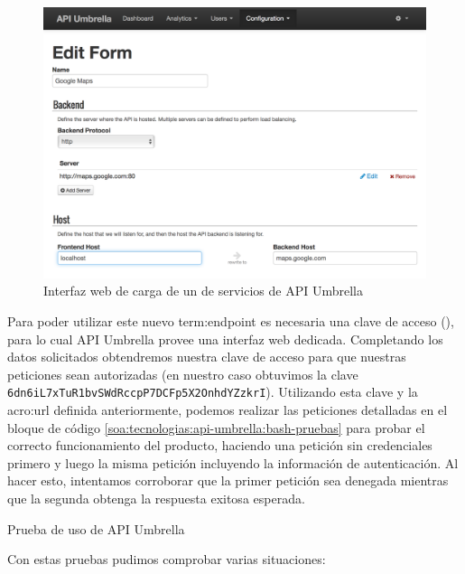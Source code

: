 \begin{figure}
  \includegraphics[width=\linewidth]{src/images/03-capitulo-3/tecnologias/api-umbrella/api-backend.png}
  \caption{Interfaz web de carga de un  de servicios de API Umbrella}
  \label{fig:api-umbrella-api-backend}
\end{figure}

Para poder utilizar este nuevo \gls{term:endpoint} es necesaria una clave de acceso (), para lo cual API Umbrella provee una interfaz web dedicada. Completando los datos solicitados obtendremos nuestra clave de acceso para que nuestras peticiones sean autorizadas (en nuestro caso obtuvimos la clave \texttt{6dn6iL7xTuR1bvSWdRccpP7DCFp5X2OnhdYZzkrI}). Utilizando esta clave y la \gls{acro:url} definida anteriormente, podemos realizar las peticiones detalladas en el bloque de código \autoref{soa:tecnologias:api-umbrella:bash-pruebas} para probar el correcto funcionamiento del producto, haciendo una petición sin credenciales primero y luego la misma petición incluyendo la información de autenticación. Al hacer esto, intentamos corroborar que la primer petición sea denegada mientras que la segunda obtenga la respuesta exitosa esperada.

\begin{listing}[H]
  \caption{Prueba de uso de API Umbrella}
  \label{soa:tecnologias:api-umbrella:bash-pruebas}
\end{listing}

Con estas pruebas pudimos comprobar varias situaciones:

